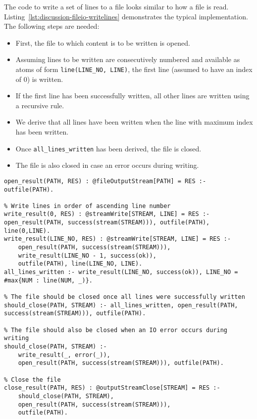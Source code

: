 The code to write a set of lines to a file looks similar to how a file is read. Listing~\ref{lst:discussion-fileio-writelines} demonstrates the typical implementation. The following steps are needed:
\begin{itemize}
	\item First, the file to which content is to be written is opened.
	\item Assuming lines to be written are consecutively numbered and available as atoms of form \texttt{line(LINE\_NO, LINE)}, the first line (assumed to have an index of 0) is written.
	\item If the first line has been successfully written, all other lines are written using a recursive rule.
	\item We derive that all lines have been written when the line with maximum index has been written.
	\item Once \texttt{all\_lines\_written} has been derived, the file is closed.
	\item The file is also closed in case an error occurs during writing.
\end{itemize}	

\begin{lstlisting}[style=asp-code, label={lst:discussion-fileio-writelines}, caption={Writing lines to a file.}]
% Open the output file
open_result(PATH, RES) : @fileOutputStream[PATH] = RES :- outfile(PATH).

% Write lines in order of ascending line number
write_result(0, RES) : @streamWrite[STREAM, LINE] = RES :- open_result(PATH, success(stream(STREAM))), outfile(PATH), line(0,LINE).
write_result(LINE_NO, RES) : @streamWrite[STREAM, LINE] = RES :-  
	open_result(PATH, success(stream(STREAM))), 
	write_result(LINE_NO - 1, success(ok)), 
	outfile(PATH), line(LINE_NO, LINE).
all_lines_written :- write_result(LINE_NO, success(ok)), LINE_NO = #max{NUM : line(NUM, _)}.
	
% The file should be closed once all lines were successfully written	
should_close(PATH, STREAM) :- all_lines_written, open_result(PATH, success(stream(STREAM))), outfile(PATH).

% The file should also be closed when an IO error occurs during writing
should_close(PATH, STREAM) :- 
	write_result(_, error(_)),
	open_result(PATH, success(stream(STREAM))), outfile(PATH).

% Close the file
close_result(PATH, RES) : @outputStreamClose[STREAM] = RES :- 
	should_close(PATH, STREAM), 
	open_result(PATH, success(stream(STREAM))), 
	outfile(PATH).
\end{lstlisting}	

